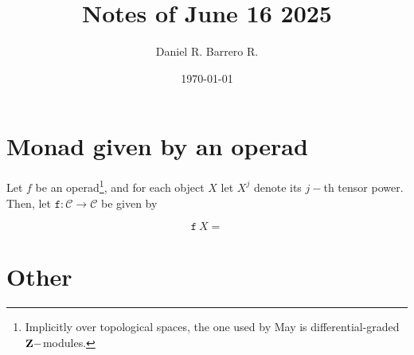 \documentclass{amsart}
\title{Notes of June 16 2025}
\author{Daniel R. Barrero R.}
\date{\today}
\begin{document}
\maketitle

\section{Monad given by an operad}

Let $f$ be an operad\footnote{Implicitly over topological spaces, the one used by May is
differential-graded $\mathbf{Z}-$modules.}, and for each object $X$ let $X^j$ denote its $j-$th tensor
power. Then, let $\mathtt{f} : \mathcal{C} \to \mathcal{C}$ be given by

$$
\mathtt{f}\ X =
$$


\section{Other}
\end{document}
